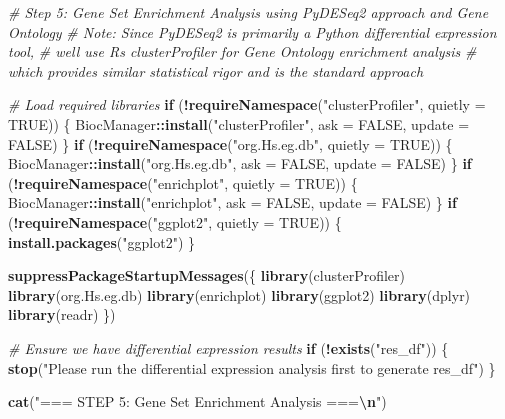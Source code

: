 \documentclass[
]{article}
\newenvironment{Shaded}{\begin{snugshade}}{\end{snugshade}}
\newcommand{\AttributeTok}[1]{\textcolor[rgb]{0.13,0.29,0.53}{#1}}
\newcommand{\CommentTok}[1]{\textcolor[rgb]{0.56,0.35,0.01}{\textit{#1}}}
\newcommand{\ConstantTok}[1]{\textcolor[rgb]{0.56,0.35,0.01}{#1}}
\newcommand{\ControlFlowTok}[1]{\textcolor[rgb]{0.13,0.29,0.53}{\textbf{#1}}}
\newcommand{\FunctionTok}[1]{\textcolor[rgb]{0.13,0.29,0.53}{\textbf{#1}}}
\newcommand{\NormalTok}[1]{#1}
\newcommand{\SpecialCharTok}[1]{\textcolor[rgb]{0.81,0.36,0.00}{\textbf{#1}}}
\newcommand{\StringTok}[1]{\textcolor[rgb]{0.31,0.60,0.02}{#1}}
\begin{document}
\begin{Shaded}
\begin{Highlighting}[]
\CommentTok{\# Step 5: Gene Set Enrichment Analysis using PyDESeq2 approach and Gene Ontology}
\CommentTok{\# Note: Since PyDESeq2 is primarily a Python differential expression tool, }
\CommentTok{\# we\textquotesingle{}ll use R\textquotesingle{}s clusterProfiler for Gene Ontology enrichment analysis}
\CommentTok{\# which provides similar statistical rigor and is the standard approach}

\CommentTok{\# Load required libraries}
\ControlFlowTok{if}\NormalTok{ (}\SpecialCharTok{!}\FunctionTok{requireNamespace}\NormalTok{(}\StringTok{"clusterProfiler"}\NormalTok{, }\AttributeTok{quietly =} \ConstantTok{TRUE}\NormalTok{)) \{}
\NormalTok{  BiocManager}\SpecialCharTok{::}\FunctionTok{install}\NormalTok{(}\StringTok{"clusterProfiler"}\NormalTok{, }\AttributeTok{ask =} \ConstantTok{FALSE}\NormalTok{, }\AttributeTok{update =} \ConstantTok{FALSE}\NormalTok{)}
\NormalTok{\}}
\ControlFlowTok{if}\NormalTok{ (}\SpecialCharTok{!}\FunctionTok{requireNamespace}\NormalTok{(}\StringTok{"org.Hs.eg.db"}\NormalTok{, }\AttributeTok{quietly =} \ConstantTok{TRUE}\NormalTok{)) \{}
\NormalTok{  BiocManager}\SpecialCharTok{::}\FunctionTok{install}\NormalTok{(}\StringTok{"org.Hs.eg.db"}\NormalTok{, }\AttributeTok{ask =} \ConstantTok{FALSE}\NormalTok{, }\AttributeTok{update =} \ConstantTok{FALSE}\NormalTok{)}
\NormalTok{\}}
\ControlFlowTok{if}\NormalTok{ (}\SpecialCharTok{!}\FunctionTok{requireNamespace}\NormalTok{(}\StringTok{"enrichplot"}\NormalTok{, }\AttributeTok{quietly =} \ConstantTok{TRUE}\NormalTok{)) \{}
\NormalTok{  BiocManager}\SpecialCharTok{::}\FunctionTok{install}\NormalTok{(}\StringTok{"enrichplot"}\NormalTok{, }\AttributeTok{ask =} \ConstantTok{FALSE}\NormalTok{, }\AttributeTok{update =} \ConstantTok{FALSE}\NormalTok{)}
\NormalTok{\}}
\ControlFlowTok{if}\NormalTok{ (}\SpecialCharTok{!}\FunctionTok{requireNamespace}\NormalTok{(}\StringTok{"ggplot2"}\NormalTok{, }\AttributeTok{quietly =} \ConstantTok{TRUE}\NormalTok{)) \{}
  \FunctionTok{install.packages}\NormalTok{(}\StringTok{"ggplot2"}\NormalTok{)}
\NormalTok{\}}

\FunctionTok{suppressPackageStartupMessages}\NormalTok{(\{}
  \FunctionTok{library}\NormalTok{(clusterProfiler)}
  \FunctionTok{library}\NormalTok{(org.Hs.eg.db)}
  \FunctionTok{library}\NormalTok{(enrichplot)}
  \FunctionTok{library}\NormalTok{(ggplot2)}
  \FunctionTok{library}\NormalTok{(dplyr)}
  \FunctionTok{library}\NormalTok{(readr)}
\NormalTok{\})}

\CommentTok{\# Ensure we have differential expression results}
\ControlFlowTok{if}\NormalTok{ (}\SpecialCharTok{!}\FunctionTok{exists}\NormalTok{(}\StringTok{"res\_df"}\NormalTok{)) \{}
  \FunctionTok{stop}\NormalTok{(}\StringTok{"Please run the differential expression analysis first to generate \textquotesingle{}res\_df\textquotesingle{}"}\NormalTok{)}
\NormalTok{\}}

\FunctionTok{cat}\NormalTok{(}\StringTok{"=== STEP 5: Gene Set Enrichment Analysis ===}\SpecialCharTok{\textbackslash{}n}\StringTok{"}\NormalTok{)}
\end{Highlighting}
\end{Shaded}
\end{document}
